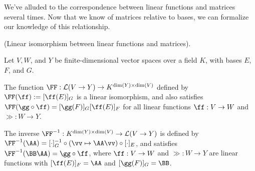 We've alluded to the correspondence between linear functions and matrices several times. Now that we know of matrices relative to bases, we can formalize our knowledge of this relationship.

\begin{theorem}
    \label{ch::lin_alg::thm::linear_functions_matrices_isomorphism}
    (Linear isomorphism between linear functions and matrices).
    
    Let $V, W$, and $Y$ be finite-dimensional vector spaces over a field $K$, with bases $E$, $F$, and $G$.

    The function $\FF:\LLLL(V \rightarrow Y) \rightarrow K^{\dim(Y) \times \dim(V)}$ defined by $\FF(\ff) := [\ff(E)]_G$ is a linear isomorphism, and also satisfies $\FF(\gg \circ \ff) = [\gg(F)]_G [\ff(E)]_F$ for all linear functions $\ff:V \rightarrow W$ and $\gg:W \rightarrow Y$.

    The inverse $\FF^{-1}:K^{\dim(Y) \times \dim(V)} \rightarrow \LLLL(V \rightarrow Y)$ is defined by $\FF^{-1}(\AA) = [\cdot]_G^{-1} \circ (\vv \mapsto \AA \vv) \circ [\cdot]_E$, and satisfies $\FF^{-1}(\BB \AA) = \gg \circ \ff$, where $\ff:V \rightarrow W$ and $\gg:W \rightarrow Y$ are linear functions with $[\ff(E)]_F = \AA$ and $[\gg(F)]_G = \BB$.
\end{theorem}

